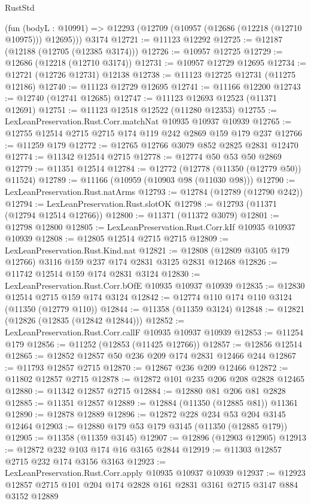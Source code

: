 \begin{lexlean}{RustStd}
\begin{coremodule}
{\begin{coremodule}
{{{{{{{{{{{{{{{{{{{{{{{{{{{{{{{{{    (fun (bodyL : @10991) => @12293 (@12709 (@10957 (@12686 (@12218 (@12710 @10975))) @12695)))
    @3174
@12721 := @11123 @12292
@12725 := @12187 (@12188 (@12705 (@12385 @3174)))
@12726 := @10957 @12725
@12729 := @12686 (@12218 (@12710 @3174))
@12731 := @10957 @12729 @12695
@12734 := @12721 (@12726 @12731) @12138
@12738 := @11123 @12725 @12731 (@11275 @12186)
@12740 := @11123 @12729 @12695
@12741 := @11166 @12200
@12743 := @12740 (@12741 @12685)
@12747 := @11123 @12693 @12523 (@11371 @12691)
@12751 := @11123 @12518 @12522 (@11280 @12353)
@12755 := LexLeanPreservation.Rust.Corr.matchNat @10935 @10937 @10939
@12765 := @12755 @12514 @2715 @2715 @174 @119 @242 @2869 @159 @179 @237
@12766 := @11259 @179
@12772 := @12765 @12766 @3079 @852 @2825 @2831 @12470
@12774 := @11342 @12514 @2715
@12778 := @12774 @50 @53 @50 @2869
@12779 := @11351 @12514
@12784 := @12772 (@12778 (@11350 (@12779 @50)) @11524)
@12789 := @11166 (@10959 (@10903 @98 (@11030 @98)))
@12790 := LexLeanPreservation.Rust.natArms
@12793 := @12784 (@12789 (@12790 @242))
@12794 := LexLeanPreservation.Rust.slotOK
@12798 := @12793 (@11371 (@12794 @12514 @12766))
@12800 := @11371 (@11372 @3079)
@12801 := @12798 @12800
@12805 := LexLeanPreservation.Rust.Corr.kIf @10935 @10937 @10939
@12808 := @12805 @12514 @2715 @2715
@12809 := LexLeanPreservation.Rust.Kind.nat
@12821 := @12808 (@12809 @3105 @179 @12766) @3116 @159 @237 @174 @2831 @3125 @2831 @12468
@12826 := @11742 @12514 @159 @174 @2831 @3124
@12830 := LexLeanPreservation.Rust.Corr.bOfE @10935 @10937 @10939
@12835 := @12830 @12514 @2715 @159 @174 @3124
@12842 := @12774 @110 @174 @110 @3124 (@11350 (@12779 @110))
@12844 := @11358 (@11359 @3124)
@12848 := @12821 (@12826 (@12835 (@12842 @12844)))
@12852 := LexLeanPreservation.Rust.Corr.callF @10935 @10937 @10939
@12853 := @11254 @179
@12856 := @11252 (@12853 (@11425 @12766))
@12857 := @12856 @12514
@12865 := @12852 @12857 @50 @236 @209 @174 @2831 @12466 @244
@12867 := @11793 @12857 @2715
@12870 := @12867 @236 @209 @12466
@12872 := @11802 @12857 @2715
@12878 := @12872 @101 @235 @206 @208 @2828 @12465
@12880 := @11342 @12857 @2715
@12884 := @12880 @81 @206 @81 @2828
@12885 := @11351 @12857
@12889 := @12884 (@11350 (@12885 @81)) @11361
@12890 := @12878 @12889
@12896 := @12872 @228 @234 @53 @204 @3145 @12464
@12903 := @12880 @179 @53 @179 @3145 (@11350 (@12885 @179))
@12905 := @11358 (@11359 @3145)
@12907 := @12896 (@12903 @12905)
@12913 := @12872 @232 @103 @174 @16 @3165 @2844
@12919 := @11303 @12857 @2715 @232 @174 @3156 @3163
@12923 := LexLeanPreservation.Rust.Corr.apply @10935 @10937 @10939
@12937 := @12923 @12857 @2715 @101 @204 @174 @2828 @161 @2831 @3161 @2715 @3147 @884 @3152 @12889
}}}}}}}}}}}}}}}}}}}}}}}}}}}}}}}}}
\end{coremodule}}
\end{coremodule}
\end{lexlean}
